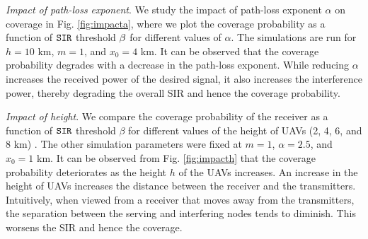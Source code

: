 \documentclass[journal,draftclsnofoot,onecolumn,12pt]{IEEEtran}
\begin{document}
{\em Impact of path-loss exponent}. We study the impact of path-loss exponent $\alpha$ on coverage in Fig. \ref{fig:impacta}, where we plot the coverage probability as a function of $\mathtt{SIR}$ threshold $\beta$ for different values of $\alpha$. The simulations are run for $h = 10$ km, $m = 1$, and $x_0 = 4$ km. It can be observed that the coverage probability degrades with a decrease in the path-loss exponent. While reducing $\alpha$ increases the received power of the desired signal, it also increases the interference power, thereby degrading the overall SIR and hence the coverage probability.

{\em Impact of height}. We compare the coverage probability of the receiver as a function of $\mathtt{SIR}$ threshold $\beta$ for different values of the height of UAVs (2, 4, 6, and 8 km) . The other simulation parameters were fixed at $m=1$, $\alpha = 2.5$, and $x_0= 1$ km. It can be observed from Fig. \ref{fig:impacth} that the coverage probability deteriorates as the height $h$ of the UAVs increases. An increase in the height of UAVs increases the distance between the receiver and the transmitters. Intuitively, when viewed from a receiver that moves away from the transmitters, the separation between the serving and interfering nodes tends to diminish. This worsens the SIR and hence the coverage.
\end{document}
